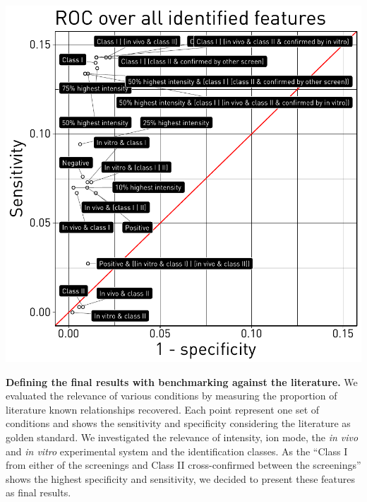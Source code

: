 \documentclass[11pt, a4paper]{article}
\begin{document}
    \begin{suppfigure}[!h]
        \includegraphics[width=.6\textwidth]{roc_classes_full.pdf}
        \caption{\textbf{Defining the final results with benchmarking against the literature.} We evaluated the relevance of various conditions by measuring the proportion of literature known relationships recovered. Each point represent one set of conditions and shows the sensitivity and specificity considering the literature as golden standard. We investigated the relevance of intensity, ion mode, the \textit{in vivo} and \textit{in vitro} experimental system and the identification classes. As the ``Class I from either of the screenings and Class II cross-confirmed between the screenings'' shows the highest specificity and sensitivity, we decided to present these features as final results.\label{fig:roc}}
    \end{suppfigure}
\end{document}
